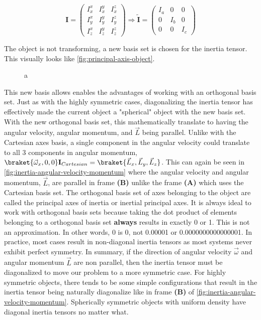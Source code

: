 \documentclass[11pt,a4paper]{book}
\newcommand{\imginput}[1]{} %
\begin{document}
			\begin{equation}
				\label{eq:Inertia tensor}
				\textbf{I} =
				\begin{pmatrix}
					I_x^x & I_x^y & I_x^z \\
					I_y^x & I_y^y & I_y^z \\
					I_z^x & I_z^y & I_z^z
				\end{pmatrix}
				\Longrightarrow
				\tilde{\textbf{I}} =
				\begin{pmatrix}
					I_{a} & 0 & 0 \\
					0 & I_{b} & 0 \\
					0 & 0 & I_{c}
				\end{pmatrix} 
			\end{equation}	
			
			\noindent The object is not transforming, a new basis set is chosen for the inertia tensor. This visually looks like \autoref{fig:principal-axis-object}.
			
			\begin{figure} [!ht]
				\centering
				\large
				\def\svgwidth{\columnwidth}
				\resizebox{16cm}{!}{\imginput{images/principal-axis-object.pdf_tex}}
				\caption{a}
				\label{fig:principal-axis-object}
			\end{figure}
			
			This new basis allows enables the advantages of working with an orthogonal basis set. Just as with the highly symmetric cases, diagonalizing the inertia tensor has effectively made the current object a "spherical" object with the new basis set. With the new orthogonal basis set, this mathematically translate to having the angular velocity, angular momentum, and $\vec{L}$ being parallel. Unlike with the Cartesian axes basis, a single component in the angular velocity could translate to all 3 components in angular momentum, $\braket{\vec{\omega}_x, 0, 0} \textbf{I}_{Cartesian} = \braket{\vec{L}_x, \vec{L}_y,\vec{L}_z}$. This can again be seen in \autoref{fig:inertia-angular-velocity-momentum} where the angular velocity and angular momentum, $\vec{L}$, are parallel in frame \textbf{(B)} unlike the frame \textbf{(A)} which uses the Cartesian basis set. The orthogonal basis set of axes belonging to the object are called the principal axes of inertia or inertial principal axes. It is always ideal to work with orthogonal basis sets because taking the dot product of elements belonging to a orthogonal basis set \textbf{always} results in exactly 0 or 1. This is not an approximation. In other words, 0 is 0, not 0.00001 or 0.0000000000000001. In practice, most cases result in non-diagonal inertia tensors as most systems never exhibit perfect symmetry. In summary, if the direction of angular velocity $\vec{\omega}$ and angular momentum $\vec{L}$ are non parallel, then the inertia tensor must be diagonalized to move our problem to a more symmetric case. For highly symmetric objects, there tends to be some simple configurations that result in the inertia tensor being naturally diagonalize like in frame \textbf{(B)} of \autoref{fig:inertia-angular-velocity-momentum}. Spherically symmetric objects with uniform density have diagonal inertia tensors no matter what. 
			
\end{document}
